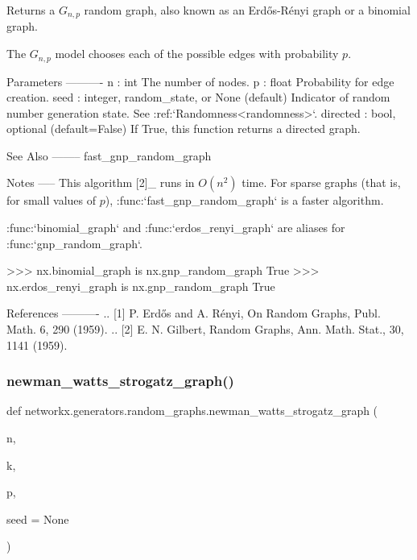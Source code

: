 \begin{DoxyVerb}Returns a $G_{n,p}$ random graph, also known as an Erdős-Rényi graph
or a binomial graph.

The $G_{n,p}$ model chooses each of the possible edges with probability $p$.

Parameters
----------
n : int
    The number of nodes.
p : float
    Probability for edge creation.
seed : integer, random_state, or None (default)
    Indicator of random number generation state.
    See :ref:`Randomness<randomness>`.
directed : bool, optional (default=False)
    If True, this function returns a directed graph.

See Also
--------
fast_gnp_random_graph

Notes
-----
This algorithm [2]_ runs in $O(n^2)$ time.  For sparse graphs (that is, for
small values of $p$), :func:`fast_gnp_random_graph` is a faster algorithm.

:func:`binomial_graph` and :func:`erdos_renyi_graph` are
aliases for :func:`gnp_random_graph`.

>>> nx.binomial_graph is nx.gnp_random_graph
True
>>> nx.erdos_renyi_graph is nx.gnp_random_graph
True

References
----------
.. [1] P. Erdős and A. Rényi, On Random Graphs, Publ. Math. 6, 290 (1959).
.. [2] E. N. Gilbert, Random Graphs, Ann. Math. Stat., 30, 1141 (1959).
\end{DoxyVerb}
 \mbox{\label{namespacenetworkx_1_1generators_1_1random__graphs_a7f077c520e2edc1908f42e3707d08878}} 
\subsubsection{\texorpdfstring{newman\+\_\+watts\+\_\+strogatz\+\_\+graph()}{newman\_watts\_strogatz\_graph()}}
{\footnotesize\ttfamily def networkx.\+generators.\+random\+\_\+graphs.\+newman\+\_\+watts\+\_\+strogatz\+\_\+graph (\begin{DoxyParamCaption}\item[{}]{n,  }\item[{}]{k,  }\item[{}]{p,  }\item[{}]{seed = {\ttfamily None} }\end{DoxyParamCaption})}


